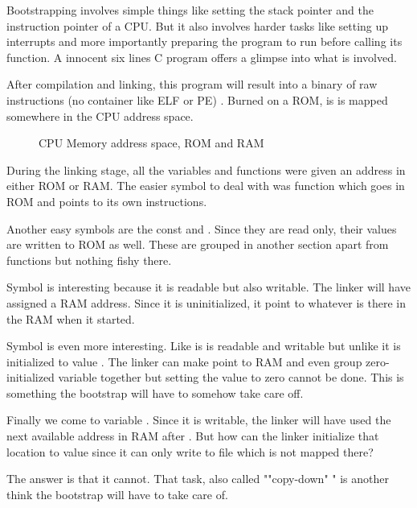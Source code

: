 Bootstrapping involves simple things like setting the stack pointer and the instruction pointer of a CPU. But it also involves harder tasks like setting up interrupts and more importantly preparing the program to run before calling its  function. A innocent six lines C program offers a glimpse into what is involved.



After compilation and linking, this program will result into a binary of raw instructions (no container like ELF or PE) . Burned on a ROM, is is mapped somewhere in the CPU address space.

\begin{figure}[H]
\caption*{CPU Memory address space, ROM and RAM}
\end{figure}

During the linking stage, all the variables and functions were given an address in either ROM or RAM. The easier symbol to deal with was function  which goes in ROM and points to its own instructions.

Another easy symbols are the const  and . Since they are read only, their values are written to ROM as well. These are grouped in another section  apart from functions but nothing fishy there.

Symbol  is interesting because it is readable but also writable. The linker will have assigned a RAM address. Since it is uninitialized, it point to whatever is there in the RAM when it started.

Symbol  is even more interesting. Like  is is readable and writable but unlike  it is initialized  to value . The linker can make  point to RAM and even group zero-initialized variable together but setting the value to zero cannot be done. This is something the bootstrap will have to somehow take care off.

Finally we come to variable . Since it is writable, the linker will have used the next available address in RAM after . But how can the linker initialize that location to value  since it can only write to file  which is not mapped there? 

The answer is that it cannot. That  task, also called ""copy-down" " is another think the bootstrap will have to take care of.

